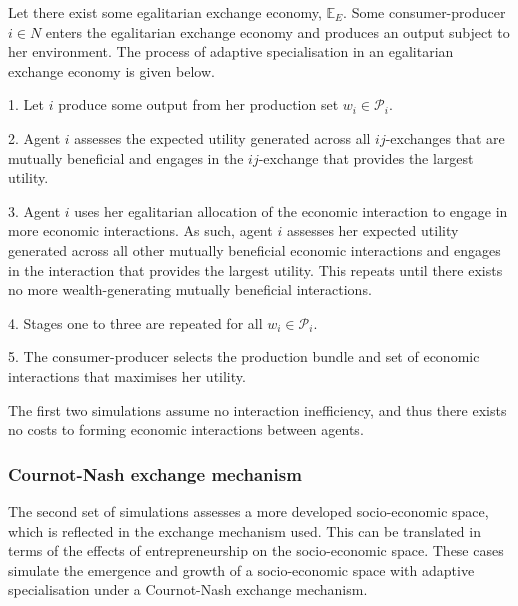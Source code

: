\begin{algorithm}
Let there exist some egalitarian exchange economy, $\mathbb{E}_{E}$. Some consumer-producer $i \in N$ enters the egalitarian exchange economy and produces an output subject to her environment. The process of adaptive specialisation in an egalitarian exchange economy is given below.
\begin{abet}
	\item[1.] Let $i$ produce some output from her production set $w_{i} \in \mathcal{P}_{i}$.

	\item[2.] Agent $i$ assesses the expected utility generated across all $ij$-exchanges that are mutually beneficial and engages in the $ij$-exchange that provides the largest utility.

	\item[3.] Agent $i$ uses her egalitarian allocation of the economic interaction to engage in more economic interactions. As such, agent $i$ assesses her expected utility generated across all other mutually beneficial economic interactions and engages in the interaction that provides the largest utility. This repeats until there exists no more wealth-generating mutually beneficial interactions.

	\item[4.] Stages one to three are repeated for all $w_{i} \in \mathcal{P}_{i}$.

	\item[5.] The consumer-producer selects the production bundle and set of economic interactions that maximises her utility.
\end{abet}
\end{algorithm}

The first two simulations assume no interaction inefficiency, and thus there exists no costs to forming economic interactions between agents.

\subsubsection{Cournot-Nash exchange mechanism}


The second set of simulations assesses a more developed socio-economic space, which is reflected in the exchange mechanism used. This can be translated in terms of the effects of entrepreneurship on the socio-economic space. These cases simulate the emergence and growth of a socio-economic space with adaptive specialisation under a Cournot-Nash exchange mechanism.

